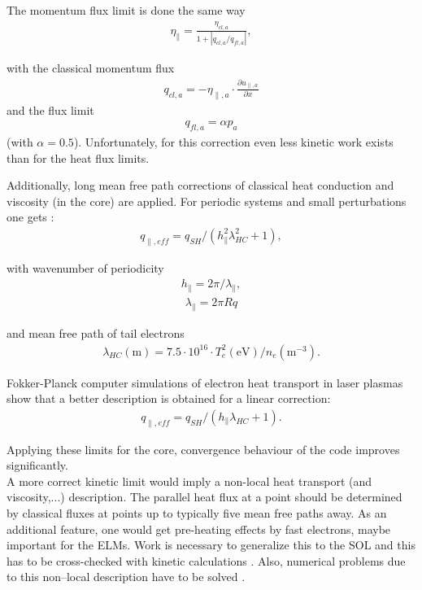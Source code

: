 \documentclass[a4paper,10pt]{report}
\begin{document}
The momentum flux limit is done the same way
\begin{gather}
  \eta _{\parallel} =\frac{\eta _{cl,a}}
   {1+|q_{cl,a}/q_{fl,a}|},
\end{gather}

with the classical momentum flux
\begin{gather}
  q_{cl,a}=-\eta _{\parallel,a} \cdot
  \frac{\partial u_{\parallel,a}}{\partial x}
\end{gather}
and the flux limit
\begin{gather}
 q_{fl,a}=\alpha p_{a}
\end{gather}
(with $\alpha = 0.5$). Unfortunately, for this correction even less kinetic
work
exists than for the heat flux limits.

Additionally,
long mean free path corrections of classical heat conduction and viscosity
(in the core) are applied.
For periodic systems and small perturbations one gets
\cite{NEUHAUSER86A}:
\begin{gather}
   q_{\parallel , eff}
    = q_{SH}/\left(h_{\parallel}^2 \lambda_{HC}^2 +1\right),
\end{gather}

with wavenumber of periodicity
\begin{gather}
  h_{\parallel}=2 \pi / \lambda_{\parallel},
\end{gather}
\begin{gather}
  \lambda_{\parallel}=2 \pi R q
\end{gather}

and mean free path of tail electrons
\cite{CHODURA84A}
\begin{gather}
  \lambda_{HC} (\mbox{m}) = 7.5\cdot 10^{16} \cdot T_e^2(\mbox{eV})/n_e(
  \mbox{m}^{-3}).
\end{gather}

Fokker-Planck computer simulations of electron heat transport in laser
plasmas
\cite{LLE91}
show that a better description is obtained for a linear
correction:
\begin{gather}
  q_{\parallel , eff}
    = q_{SH}/(h_{\parallel} \lambda_{HC} +1).
\end{gather}

Applying these limits for the core, convergence behaviour of the code
improves significantly.\\
A more correct kinetic limit would imply a
non-local heat transport (and viscosity,...) description.
The parallel heat flux at a point should be determined by
classical fluxes at points
up to typically five mean free paths away. As an additional feature, one
would get
pre-heating effects by fast electrons, maybe important for the ELMs.
Work is necessary to generalize this to the SOL
\cite{KRASH92A,YURI91A}
and this has to be cross-checked
with kinetic calculations \cite{Abou-Assaleh92}. Also, numerical problems due
to this non--local description have to be solved \cite{PRASAD91A}.
\end{document}
